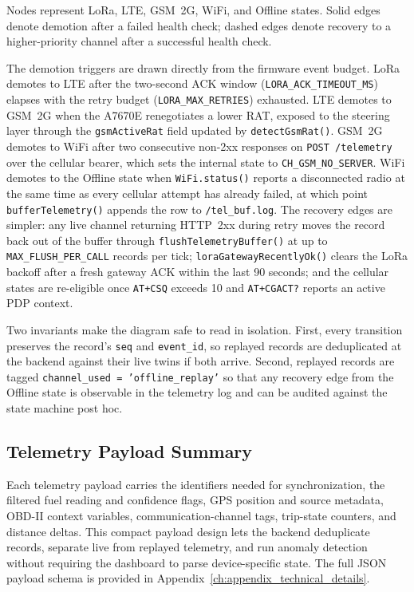 \noindent
Nodes represent LoRa, LTE, GSM~2G, WiFi, and Offline states. Solid edges denote demotion after a failed health check; dashed edges denote recovery to a higher-priority channel after a successful health check.

The demotion triggers are drawn directly from the firmware event budget. LoRa demotes to LTE after the two-second ACK window (\texttt{LORA\_ACK\_TIMEOUT\_MS}) elapses with the retry budget (\texttt{LORA\_MAX\_RETRIES}) exhausted. LTE demotes to GSM~2G when the A7670E renegotiates a lower RAT, exposed to the steering layer through the \texttt{gsmActiveRat} field updated by \texttt{detectGsmRat()}. GSM~2G demotes to WiFi after two consecutive non-2xx responses on \texttt{POST~/telemetry} over the cellular bearer, which sets the internal state to \texttt{CH\_GSM\_NO\_SERVER}. WiFi demotes to the Offline state when \texttt{WiFi.status()} reports a disconnected radio at the same time as every cellular attempt has already failed, at which point \texttt{bufferTelemetry()} appends the row to \texttt{/tel\_buf.log}. The recovery edges are simpler: any live channel returning HTTP~2xx during retry moves the record back out of the buffer through \texttt{flushTelemetryBuffer()} at up to \texttt{MAX\_FLUSH\_PER\_CALL} records per tick; \texttt{loraGatewayRecentlyOk()} clears the LoRa backoff after a fresh gateway ACK within the last 90 seconds; and the cellular states are re-eligible once \texttt{AT+CSQ} exceeds 10 and \texttt{AT+CGACT?} reports an active PDP context.

Two invariants make the diagram safe to read in isolation. First, every transition preserves the record's \texttt{seq} and \texttt{event\_id}, so replayed records are deduplicated at the backend against their live twins if both arrive. Second, replayed records are tagged \texttt{channel\_\allowbreak used = 'offline\_\allowbreak replay'} so that any recovery edge from the Offline state is observable in the telemetry log and can be audited against the state machine post hoc.

\subsection{Telemetry Payload Summary}

Each telemetry payload carries the identifiers needed for synchronization, the filtered fuel reading and confidence flags, GPS position and source metadata, OBD-II context variables, communication-channel tags, trip-state counters, and distance deltas. This compact payload design lets the backend deduplicate records, separate live from replayed telemetry, and run anomaly detection without requiring the dashboard to parse device-specific state. The full JSON payload schema is provided in Appendix~\ref{ch:appendix_technical_details}.

